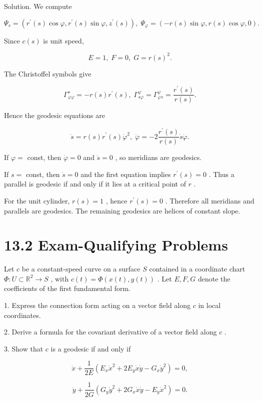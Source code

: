 \documentclass[10pt]{article}
\begin{document}
Solution. We compute

\[
{\Psi }_{s} = \left( {{r}^{\prime }\left( s\right) \cos \varphi ,{r}^{\prime }\left( s\right) \sin \varphi ,{z}^{\prime }\left( s\right) }\right) ,\;{\Psi }_{\varphi } = \left( {-r\left( s\right) \sin \varphi ,r\left( s\right) \cos \varphi ,0}\right) .
\]

Since \(c\left( s\right)\) is unit speed,

\[
E = 1,\;F = 0,\;G = r{\left( s\right) }^{2}.
\]

The Christoffel symbols give

\[
{\Gamma }_{\varphi \varphi }^{s} =  - r\left( s\right) {r}^{\prime }\left( s\right) ,\;{\Gamma }_{s\varphi }^{\varphi } = {\Gamma }_{\varphi s}^{\varphi } = \frac{{r}^{\prime }\left( s\right) }{r\left( s\right) }.
\]

Hence the geodesic equations are

\[
\ddot{s} = r\left( s\right) {r}^{\prime }\left( s\right) {\dot{\varphi }}^{2},\;\ddot{\varphi } =  - 2\frac{{r}^{\prime }\left( s\right) }{r\left( s\right) }\dot{s}\dot{\varphi }.
\]

If \(\varphi  =\) const, then \(\dot{\varphi } = 0\) and \(\ddot{s} = 0\) , so meridians are geodesics.

If \(s =\) const, then \(\dot{s} = 0\) and the first equation implies \({r}^{\prime }\left( s\right)  = 0\) . Thus a parallel is geodesic if and only if it lies at a critical point of \(r\) .

For the unit cylinder, \(r\left( s\right)  = 1\) , hence \({r}^{\prime }\left( s\right)  = 0\) . Therefore all meridians and parallels are geodesics. The remaining geodesics are helices of constant slope.

\section*{13.2 Exam-Qualifying Problems}

\begin{problem}[title=PROBLEM 3 (7 POINTS)]
Let \(c\) be a constant-speed curve on a surface \(S\) contained in a coordinate chart \(\Phi  : U \subset  {\mathbb{R}}^{2} \rightarrow  S\) , with \(c\left( t\right)  = \Phi \left( {x\left( t\right) ,y\left( t\right) }\right)\) . Let \(E,F,G\) denote the coefficients of the first fundamental form.

1. Express the connection form acting on a vector field along \(c\) in local coordinates.

2. Derive a formula for the covariant derivative of a vector field along \(c\) .

3. Show that \(c\) is a geodesic if and only if

\[
\ddot{x} + \frac{1}{2E}\left( {{E}_{x}{\dot{x}}^{2} + 2{E}_{y}\dot{x}\dot{y} - {G}_{x}{\dot{y}}^{2}}\right)  = 0,
\]

\[
\ddot{y} + \frac{1}{2G}\left( {{G}_{y}{\dot{y}}^{2} + 2{G}_{x}\dot{x}\dot{y} - {E}_{y}{\dot{x}}^{2}}\right)  = 0.
\]
\end{problem}
\end{document}
